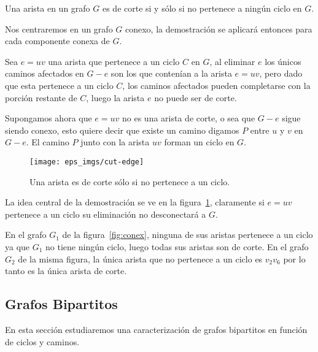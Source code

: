\begin{teorema}\label{teo:cut-edge}
Una arista en un grafo $G$ es de corte si y sólo si no pertenece a ningún ciclo en $G$.

\begin{demostracion}
Nos centraremos en un grafo $G$ conexo, la demostración se aplicará entonces para cada componente conexa de $G$.

Sea $e=uv$ una arista que pertenece a un ciclo $C$ en $G$, al eliminar $e$ los únicos caminos afectados en $G-e$ son los que contenían a la arista $e=uv$, pero dado que esta pertenece a un ciclo $C$, los caminos afectados pueden completarse con la porción restante de $C$, luego la arista $e$ no puede ser de corte.

Supongamos ahora que $e=uv$ no es una arista de corte, o sea que $G-e$ sigue siendo conexo, esto quiere decir que existe un camino digamos $P$ entre $u$ y $v$ en $G-e$.
El camino $P$ junto con la arista $uv$ forman un ciclo en $G$.

\begin{figure}[h!]
\centering
\hspace*{6em}\texttt{[image: eps\_imgs/cut-edge]}
\caption{Una arista es de corte sólo si no pertenece a un ciclo.}
\label{fig:cut-edge}
\end{figure}
La idea central de la demostración se ve en la figura~\ref{fig:cut-edge}, claramente si $e=uv$ pertenece a un ciclo su eliminación no desconectará a $G$.
\end{demostracion}
\end{teorema}

\begin{ejemplo}
En el grafo $G_1$ de la figura~\ref{fig:conex}, ninguna de sus aristas pertenece a un ciclo ya que $G_1$ no tiene ningún ciclo, luego todas sus aristas son de corte.
En el grafo $G_2$ de la misma figura, la única arista que no pertenece a un ciclo es $v_2v_6$ por lo tanto es la única arista de corte.
\end{ejemplo}


\subsection{Grafos Bipartitos}
En esta sección estudiaremos una caracterización de grafos bipartitos en función de ciclos y caminos.


